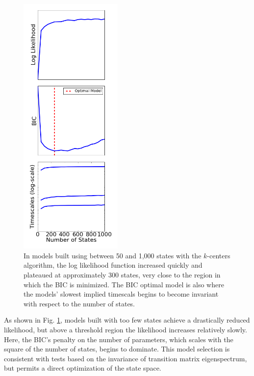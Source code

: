 \documentclass[twocolumn,floatfix,nofootinbib,aps]{revtex4-1}
\begin{document}
\begin{figure}[h]
\centering
\includegraphics[width=2in]{figs/like_comp.png}
\caption{In models built using between 50 and 1,000 states with the $k$-centers algorithm, the log likelihood function increased quickly and plateaued at approximately 300 states, very close to the region in which the BIC is minimized. The BIC optimal model is also where the models' slowest implied timescals begins to become invariant with respect to the number of states.}
\label{fig:mullerlike}
\end{figure}

As shown in Fig. \ref{fig:mullerlike}, models built with too few states achieve a drastically reduced likelihood, but above a threshold region the likelihood increases relatively slowly. Here, the BIC's penalty on the number of parameters, which scales with the square of the number of states, begins to dominate. This model selection is consistent with tests based on the invariance of transition matrix eigenspectrum, but permits a direct optimization of the state space.
\end{document}
